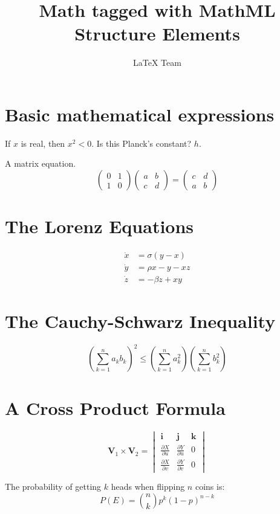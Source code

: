 \documentclass{ximera}
\title{Math tagged with MathML Structure Elements}
\author{LaTeX Team}
\begin{document}
\maketitle

\section{Basic mathematical expressions}

If $x$ is real, then $x^{2} < 0$. Is this Planck's constant? $h$.

A matrix equation.
\[
\begin{pmatrix}0&1\\1&0\end{pmatrix}
\begin{pmatrix}a&b\\c&d\end{pmatrix}
=
\begin{pmatrix}c&d\\a&b\end{pmatrix}
\]

\section{The Lorenz Equations}
\[\begin{aligned}
\dot{x} & = \sigma(y-x) \\
\dot{y} & = \rho x - y - xz \\
\dot{z} & = -\beta z + xy
\end{aligned} \]

\section{The Cauchy-Schwarz Inequality}
\[ \left( \sum_{k=1}^n a_k b_k \right)^2 \leq \left( \sum_{k=1}^n a_k^2 \right) \left( \sum_{k=1}^n b_k^2 \right) \]
\section{A Cross Product Formula}
\[\mathbf{V}_1 \times \mathbf{V}_2 =  \begin{vmatrix}
\mathbf{i} & \mathbf{j} & \mathbf{k} \\
\frac{\partial X}{\partial u} &  \frac{\partial Y}{\partial u} & 0 \\
\frac{\partial X}{\partial v} &  \frac{\partial Y}{\partial v} & 0
\end{vmatrix}  \]

The probability of getting $k$ heads when flipping $n$ coins is: 
\[P(E) = {n \choose k} p^k (1-p)^{ n-k} \]
\end{document}
